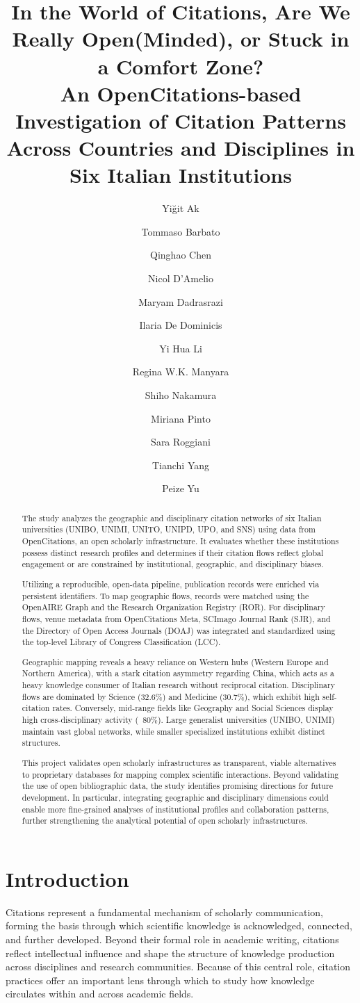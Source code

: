 \documentclass[year=2026]{cup-journal}
\title[OpenCitations coverage at UniBO]{In the World of Citations, Are We Really Open(Minded), or Stuck in a Comfort Zone? \\[0.4em]
\normalsize An OpenCitations-based Investigation of Citation Patterns Across Countries and Disciplines in Six Italian Institutions}
\author{Yiğit Ak}
\author{Tommaso Barbato}
\author{Qinghao Chen}
\author{Nicol D'Amelio}
\author{Maryam Dadrasrazi}
\author{Ilaria De Dominicis}
\author{Yi Hua Li}
\author{Regina W.K. Manyara}
\author{Shiho Nakamura}
\author{Miriana Pinto}
\author{Sara Roggiani}
\author{Tianchi Yang}
\author{Peize Yu}
\affiliation{University of Bologna, Bologna, Italy}
\begin{document}
\begin{abstract}
The study analyzes the geographic and disciplinary citation networks of six Italian universities (UNIBO, UNIMI, UNITO, UNIPD, UPO, and SNS) using data from OpenCitations, an open scholarly infrastructure. It evaluates whether these institutions possess distinct research profiles and determines if their citation flows reflect global engagement or are constrained by institutional, geographic, and disciplinary biases.

Utilizing a reproducible, open-data pipeline, publication records were enriched via persistent identifiers. To map geographic flows, records were matched using the OpenAIRE Graph and the Research Organization Registry (ROR). For disciplinary flows, venue metadata from OpenCitations Meta, SCImago Journal Rank (SJR), and the Directory of Open Access Journals (DOAJ) was integrated and standardized using the top-level Library of Congress Classification (LCC).

Geographic mapping reveals a heavy reliance on Western hubs (Western Europe and Northern America), with a stark citation asymmetry regarding China, which acts as a heavy knowledge consumer of Italian research without reciprocal citation. Disciplinary flows are dominated by Science (32.6\%) and Medicine (30.7\%), which exhibit high self-citation rates. Conversely, mid-range fields like Geography and Social Sciences display high cross-disciplinary activity (~80\%). Large generalist universities (UNIBO, UNIMI) maintain vast global networks, while smaller specialized institutions exhibit distinct structures.

This project validates open scholarly infrastructures as transparent, viable alternatives to proprietary databases for mapping complex scientific interactions. Beyond validating the use of open bibliographic data, the study identifies promising directions for future development. In particular, integrating geographic and disciplinary dimensions could enable more fine-grained analyses of institutional profiles and collaboration patterns, further strengthening the analytical potential of open scholarly infrastructures.

\end{abstract}

\section{Introduction}
Citations represent a fundamental mechanism of scholarly communication, forming the basis through which scientific knowledge is acknowledged, connected, and further developed. Beyond their formal role in academic writing, citations reflect intellectual influence and shape the structure of knowledge production across disciplines and research communities. Because of this central role, citation practices offer an important lens through which to study how knowledge circulates within and across academic fields.
\end{document}
